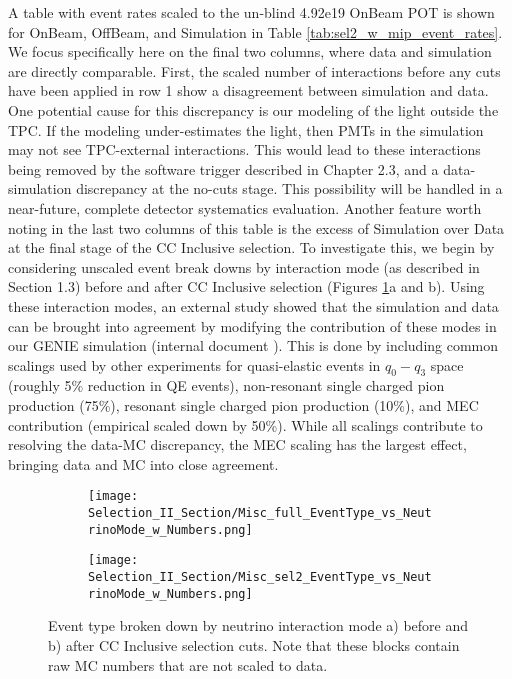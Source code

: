 A table with event rates scaled to the un-blind 4.92e19 OnBeam POT is shown for OnBeam, OffBeam, and Simulation in Table \ref{tab:sel2_w_mip_event_rates}. We focus specifically here on the final two columns, where data and simulation are directly comparable. First, the scaled number of interactions before any cuts have been applied in row 1 show a disagreement between simulation and data.  One potential cause for this discrepancy is our modeling of the light outside the TPC.  If the modeling under-estimates the light, then PMTs in the simulation may not see TPC-external interactions. This would lead to these interactions being removed by the software trigger described in Chapter 2.3, and a data-simulation discrepancy at the no-cuts stage. This possibility will be handled in a near-future, complete detector systematics evaluation.  Another feature worth noting in the last two columns of this table is the excess of Simulation over Data at the final stage of the CC Inclusive selection.  To investigate this, we begin by considering unscaled event break downs by interaction mode (as described in Section 1.3) before and after CC Inclusive selection (Figures \ref{fig:physics_sel2_inttype}a and b).  Using these interaction modes, an external study showed that the simulation and data can be brought into agreement by modifying the contribution of these modes in our GENIE simulation (internal document \cite{bib:jz_data_mc_comparison}). This is done by including common scalings used by other experiments for quasi-elastic events in $q_0 - q_3$ space (roughly 5\% reduction in QE events), non-resonant single charged pion production (75\%), resonant single charged pion production (10\%), and MEC contribution (empirical scaled down by 50\%). While all scalings contribute to resolving the data-MC discrepancy, the MEC scaling has the largest effect, bringing data and MC into close agreement. 

\begin{figure}[H]
  \begin{subfigure}[t]{0.35\textwidth}
\texttt{[image: Selection\_II\_Section/Misc\_full\_EventType\_vs\_NeutrinoMode\_w\_Numbers.png]}
    \caption{ }
  \end{subfigure} 
  \hspace{15 mm}
  \begin{subfigure}[t]{0.35\textwidth}
\texttt{[image: Selection\_II\_Section/Misc\_sel2\_EventType\_vs\_NeutrinoMode\_w\_Numbers.png]}
    \caption{ }
  \end{subfigure} 
\caption{ Event type broken down by neutrino interaction mode a) before and b) after CC Inclusive selection cuts. Note that these blocks contain raw MC numbers that are not scaled to data. }
\label{fig:physics_sel2_inttype}
\end{figure}



